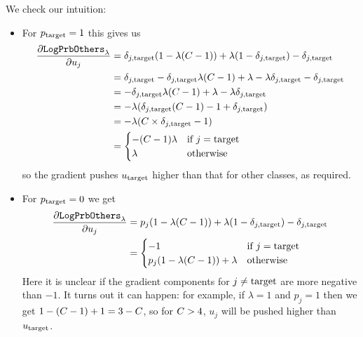 \documentclass[../main.tex]{subfiles}
\begin{document}
We check our intuition:
\begin{itemize}
    \item For $p_{\mathrm{target}} = 1$ this gives us
          \begin{align*}
              \frac{\partial \mathtt{LogPrbOthers}_{\lambda}}{\partial u_j}
               & = \delta_{j, \mathrm{target}} (1 - \lambda (C - 1)) + \lambda (1 - \delta_{j, \mathrm{target}}) - \delta_{j, \mathrm{target}}      \\
               & = \delta_{j, \mathrm{target}} - \delta_{j, \mathrm{target}} \lambda (C - 1) + \lambda - \lambda \delta_{j, \mathrm{target}} - \delta_{j, \mathrm{target}} \\
               & = - \delta_{j, \mathrm{target}} \lambda (C - 1) + \lambda - \lambda \delta_{j, \mathrm{target}}             \\
               & = - \lambda (\delta_{j, \mathrm{target}} (C - 1) - 1 + \delta_{j, \mathrm{target}})                         \\
               & = - \lambda (C \times \delta_{j, \mathrm{target}} - 1)                                      \\
               & = \begin{cases}
                       - (C - 1) \lambda & \text{if } j = \mathrm{target} \\
                       \lambda                    & \text{otherwise}
                   \end{cases}
          \end{align*}
          so the gradient pushes $u_{\mathrm{target}}$ higher than that for other classes, as required.

    \item For $p_{\mathrm{target}} = 0$ we get
          \begin{align*}
              \frac{\partial \mathtt{LogPrbOthers}_{\lambda}}{\partial u_j}
               & = p_j (1 - \lambda (C - 1)) + \lambda (1 - \delta_{j, \mathrm{target}}) - \delta_{j, \mathrm{target}}        \\
               & = \begin{cases}
                       -1                                           & \text{if } j = \mathrm{target} \\
                       p_j(1 - \lambda ( C -1 )) + \lambda & \text{otherwise}
                   \end{cases}
          \end{align*}
Here it is unclear if the gradient components for $j \neq \mathrm{target}$ are more negative than $-1$.
It turns out it can happen: for example, if $\lambda = 1$ and $p_j = 1$ then we get $1 - (C -1) + 1 = 3 - C$, so for $C > 4$, $u_j$ will be pushed higher than $u_{\mathrm{target}}$.
\end{itemize}
\end{document}
